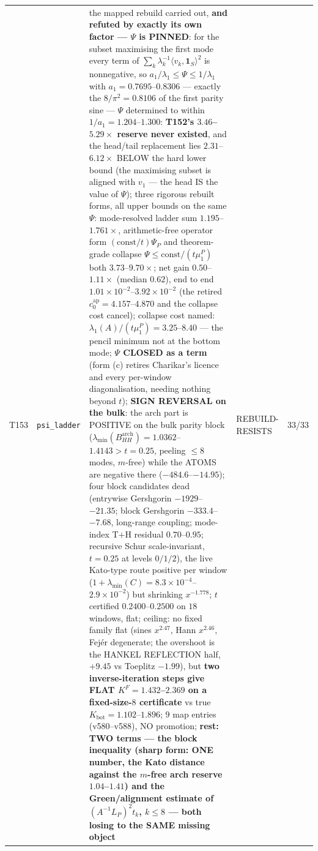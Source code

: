 \documentclass[11pt,a4paper]{article}
\begin{document}
{\begin{xltabular}{\linewidth}{@{}p{0.95cm} >{\raggedright\arraybackslash}p{3.1cm} Y >{\raggedright\scriptsize\arraybackslash}p{3.35cm} p{1.15cm}@{}}
T153 & \texttt{\scriptsize psi\_\allowbreak ladder} & the mapped rebuild carried out, \textbf{and refuted by exactly its own factor --- $\Psi$ is PINNED}: for the subset maximising the first mode every term of $\sum_k\lambda_k^{-1}\langle v_k,\mathbf 1_S\rangle^2$ is nonnegative, so $a_1/\lambda_1\le\Psi\le1/\lambda_1$ with $a_1=0.7695$--$0.8306$ --- exactly the $8/\pi^2=0.8106$ of the first parity sine --- $\Psi$ determined to within $1/a_1=1.204$--$1.300$: \textbf{T152's $3.46$--$5.29\times$ reserve never existed}, and the head/tail replacement lies $2.31$--$6.12\times$ BELOW the hard lower bound (the maximising subset is aligned with $v_1$ --- the head IS the value of $\Psi$); three rigorous rebuilt forms, all upper bounds on the same $\Psi$: mode-resolved ladder sum $1.195$--$1.761\times$, arithmetic-free operator form $(\mathrm{const}/t)\Psi_P$ and theorem-grade collapse $\Psi\le\mathrm{const}/(t\mu^P_1)$ both $3.73$--$9.70\times$; net gain $0.50$--$1.11\times$ (median $0.62$), end to end $1.01\times10^{-2}$--$3.92\times10^{-2}$ (the retired $c_0^{\mathrm{ap}}=4.157$--$4.870$ and the collapse cost cancel); collapse cost named: $\lambda_1(A)/(t\mu^P_1)=3.25$--$8.40$ --- the pencil minimum not at the bottom mode; \textbf{$\Psi$ CLOSED as a term} (form (c) retires Charikar's licence and every per-window diagonalisation, needing nothing beyond $t$); \textbf{SIGN REVERSAL on the bulk}: the arch part is POSITIVE on the bulk parity block ($\lambda_{\min}(B^{\mathrm{arch}}_{HH})=1.0362$--$1.4143>t=0.25$, peeling $\le8$ modes, $m$-free) while the ATOMS are negative there ($-484.6$--$-14.95$); four block candidates dead (entrywise Gershgorin $-1929$--$-21.35$; block Gershgorin $-333.4$--$-7.68$, long-range coupling; mode-index T$+$H residual $0.70$--$0.95$; recursive Schur scale-invariant, $t=0.25$ at levels $0/1/2$), the live Kato-type route positive per window ($1+\lambda_{\min}(C)=8.3\times10^{-4}$--$2.9\times10^{-2}$) but shrinking $x^{-1.778}$; $t$ certified $0.2400$--$0.2500$ on $18$ windows, flat; ceiling: no fixed family flat (sines $x^{2.47}$, Hann $x^{2.46}$, Fej\'er degenerate; the overshoot is the HANKEL REFLECTION half, $+9.45$ vs Toeplitz $-1.99$), but \textbf{two inverse-iteration steps give FLAT $K^F=1.432$--$2.369$ on a fixed-size-$8$ certificate} vs true $K_{\mathrm{bot}}=1.102$--$1.896$; $9$ map entries (v580--v588), NO promotion; \textbf{rest: TWO terms --- the block inequality (sharp form: ONE number, the Kato distance against the $m$-free arch reserve $1.04$--$1.41$) and the Green/alignment estimate of $(A^{-1}L_P)^2t_k$, $k\le8$ --- both losing to the SAME missing object} & REBUILD-RESISTS & 33/33\\

\end{xltabular}}
\end{document}
